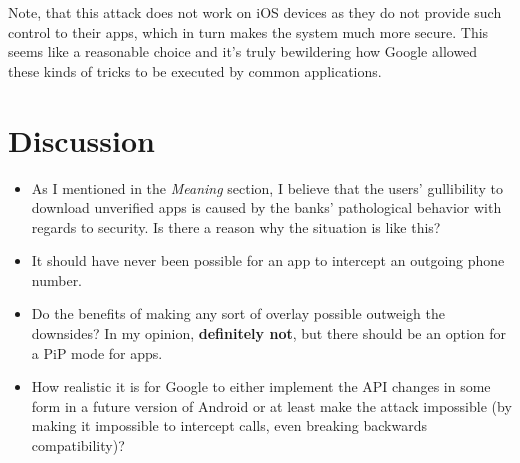 \documentclass{article}
\begin{document}
Note, that this attack does not work on iOS devices as they do not provide such control to their apps, which in turn makes the system much more secure. This seems like a reasonable choice and it's truly bewildering how Google allowed these kinds of tricks to be executed by common applications.


\section{Discussion}

\begin{itemize}
	\item As I mentioned in the \textit{Meaning} section, I believe that the users' gullibility to download unverified apps is caused by the banks' pathological behavior with regards to security. Is there a reason why the situation is like this?
	\item It should have never been possible for an app to intercept an outgoing phone number.
	\item Do the benefits of making any sort of overlay possible outweigh the downsides? In my opinion, \textbf{definitely not}, but there should be an option for a PiP mode for apps.
	\item How realistic it is for Google to either implement the API changes in some form in a future version of Android or at least make the attack impossible (by making it impossible to intercept calls, even breaking backwards compatibility)?
\end{itemize}
\end{document}

